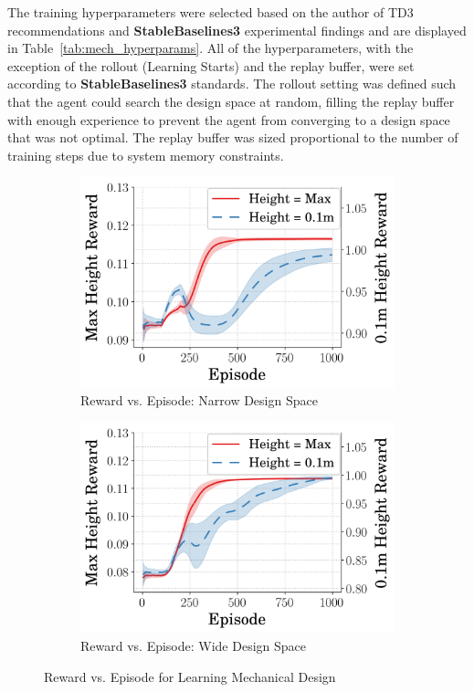 The training hyperparameters were selected based on the author of TD3 recommendations and \textbf{StableBaselines3} \cite{stable-baselines3} experimental findings and are displayed in Table~\ref{tab:mech_hyperparams}. All of the hyperparameters, with the exception of the rollout (Learning Starts) and the replay buffer, were set according to \textbf{StableBaselines3} standards. The rollout setting was defined such that the agent could search the design space at random, filling the replay buffer with enough experience to prevent the agent from converging to a design space that was not optimal. The replay buffer was sized proportional to the number of training steps due to system memory constraints. 

%
\begin{figure}[tb!]
        \centering
        \begin{subfigure}{.49\textwidth}
          \centering
          \includegraphics[width=\linewidth]{figures/Ch4/design_space_narr/RewVsTime.png}
          \caption{Reward vs. Episode: Narrow Design Space}
          \label{fig:rew_vs_step_narr}
        \end{subfigure}%
        \hfill
        \begin{subfigure}{.49\textwidth}
          \centering
          \includegraphics[width=\linewidth]{figures/Ch4/design_space_wide/RewVsTime.png}
           \caption{Reward vs. Episode: Wide Design Space}
           \label{fig:rew_v_step_wide}
        \end{subfigure}
         \caption{Reward vs. Episode for Learning Mechanical Design}
         \label{fig:rew_vs_step}
\end{figure}
